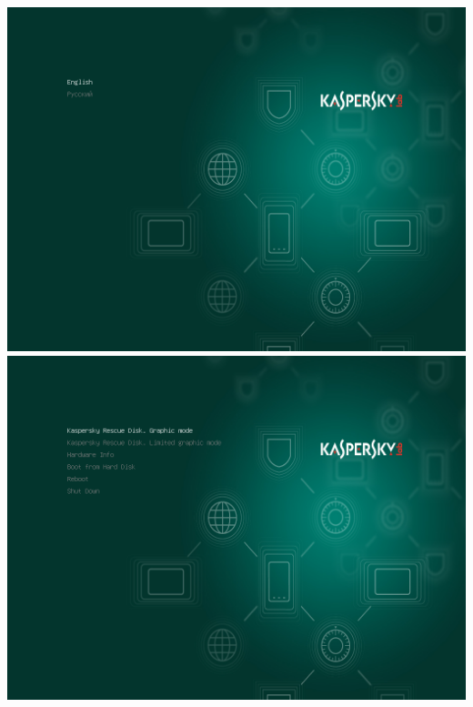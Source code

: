 \begin{center}
	\includegraphics[scale=0.25]{pic/krd2}	\includegraphics[scale=0.25]{pic/krd3}\\

\end{center}

